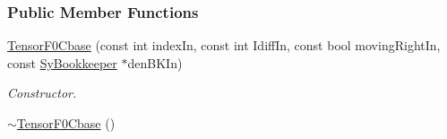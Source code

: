 \subsubsection*{Public Member Functions}
\begin{DoxyCompactItemize}
\item 
\hyperlink{classCheMPS2_1_1TensorF0Cbase_a4768747102a6722f85df6f4a4e67b43e}{Tensor\-F0\-Cbase} (const int index\-In, const int Idiff\-In, const bool moving\-Right\-In, const \hyperlink{classCheMPS2_1_1SyBookkeeper}{Sy\-Bookkeeper} $\ast$den\-B\-K\-In)
\begin{DoxyCompactList}\small\item\em Constructor. \end{DoxyCompactList}\item 
\hypertarget{classCheMPS2_1_1TensorF0Cbase_a7259ac956e0595fa35f741332286f49d}{\hyperlink{classCheMPS2_1_1TensorF0Cbase_a7259ac956e0595fa35f741332286f49d}{$\sim$\-Tensor\-F0\-Cbase} ()}\label{classCheMPS2_1_1TensorF0Cbase_a7259ac956e0595fa35f741332286f49d}


\end{DoxyCompactItemize}
